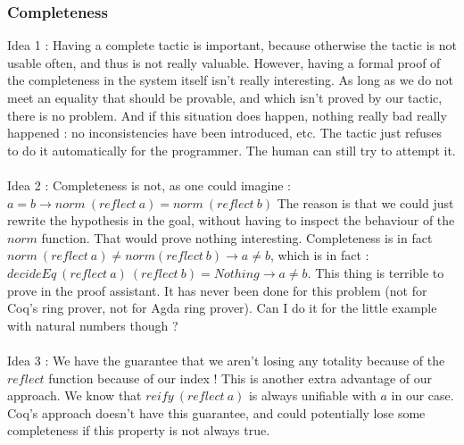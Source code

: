 		\subsubsection{Completeness}
		
Idea 1 : Having a complete tactic is important, because otherwise the tactic is not usable often, and thus is not really valuable. However, having a formal proof of the completeness in the system itself isn't really interesting. As long as we do not meet an equality that should be provable, and which isn't proved by our tactic, there is no problem. And if this situation does happen, nothing really bad really happened : no inconsistencies have been introduced, etc. The tactic just refuses to do it automatically for the programmer. The human can still try to attempt it. \\
\\
Idea 2 : Completeness is not, as one could imagine : \\
$a=b \rightarrow norm\ (reflect\ a) = norm\ (reflect\ b)$
The reason is that we could just rewrite the hypothesis in the goal, without having to inspect the behaviour of the $norm$ function. That would prove nothing interesting.
Completeness is in fact $norm\ (reflect\ a) \neq norm(reflect\ b) \rightarrow a \neq b$, which is in fact :
$decideEq\ (reflect\ a)\ (reflect\ b) = Nothing \rightarrow a \neq b$.
This thing is terrible to prove in the proof assistant. It has never been done for this problem (not for Coq's ring prover, not for Agda ring prover). Can I do it for the little example with natural numbers though ? \\
\\
Idea 3 : We have the guarantee that we aren't losing any totality because of the $reflect$ function because of our index ! This is another extra advantage of our approach. We know that $reify\ (reflect\ a)$ is always unifiable with $a$ in our case. Coq's approach doesn't have this guarantee, and could potentially lose some completeness if this property is not always true.